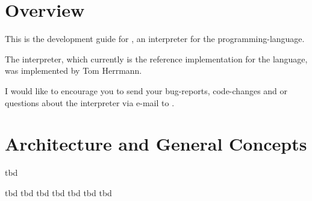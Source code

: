 \def\myDocumentTypeArticle{-}


\globalDate{\today}






\begin{titlepage}
\maketitle
\vfill
\tableofcontents
\end{titlepage}

\section{Overview}

This is the development guide for \setlX, an interpreter for the \SetlX{} programming-language.

The \setlX{} interpreter, which currently is the reference implementation for the \SetlX{} language, was implemented by Tom Herrmann.

I would like to encourage you to send your bug-reports, code-changes and or questions about the \setlX{} interpreter via e-mail to .

\section{Architecture and General Concepts}

tbd


\begin{itemize}
			{tbd}
			{tbd}
			{tbd}
			{tbd}
			{tbd}
			{tbd}
			{tbd}
\end{itemize}

